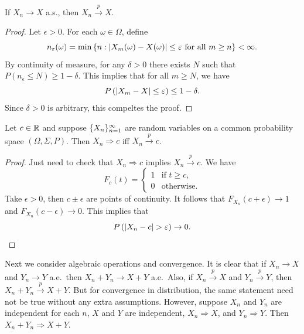 \documentclass[a4paper]{article}
\newcommand{\convd}{\Rightarrow}
\newcommand{\convp}{\xrightarrow{p}}
\begin{document}
\begin{prop}
  If $X_n \to X$ a.s., then $X_n \convp X$.
\end{prop}

\begin{proof}
  Let $\epsilon > 0$. For each $\omega \in \Omega$, define
  \[
    n_\varepsilon (\omega) = \min \left\{ n : \left\lvert X_m(\omega) - X(\omega)\right\rvert
    \leq \varepsilon \text{ for all $m \geq n$} \right\} < \infty.
  \]
  By continuity of measure, for any $\delta > 0$ there exists $N$ such that
  $P \left( n_\epsilon \leq N \right) \geq 1 - \delta$.
  This implies that for all $m \geq N$, we have
  \[
    P \left( \left\lvert X_m - X\right\rvert \leq \varepsilon \right) \leq 1 - \delta.
  \]
  Since $\delta > 0$ is arbitrary, this compeltes the proof.

\end{proof}

\begin{prop}
  Let $c \in \mathbb{R}$ and suppose $\{ X_n \}_{n=1}^\infty$ are random variables
  on a common probability space
  $(\Omega, \Sigma, P)$. Then $X_n \convd c$ iff $X_n \convp c$.
\end{prop}

\begin{proof}
  Just need to check that $X_n \convd c$ implies $X_n \convp c$.
  We have
  \[
    F_c (t) = \begin{cases}
    1 & \text{if $t \geq c$,} \\
    0 & \text{otherwise.}
    \end{cases}
  \]
  Take $\epsilon > 0$, then $c \pm \epsilon$ are points of continuity.
  It follows that $F_{X_n} (c + \epsilon) \to 1$ and $F_{X_n} (c - \epsilon)
    \to 0$. This implies that
  \[
    P \left( \left\lvert X_n - c\right\rvert > \varepsilon \right) \to 0.
  \]

\end{proof}


Next we consider algebraic operations and convergence.
It is clear that if $X_n \to X$ and $Y_n \to Y$ a.e.\, then $X_n + Y_n
  \to X + Y$ a.e.\ Also, if $X_n \convp X$ and $Y_n \convp Y$, then
$X_n + Y_n \convp X + Y$. But for convergence in distribution,
the same statement need not be true without any extra assumptions.
However, suppose $X_n$ and $Y_n$ are independent for each $n$, $X$ and $Y$
are independent, $X_n \convd X$, and $Y_n \convd Y$. Then $X_n + Y_n
  \convd X + Y$.
\end{document}
